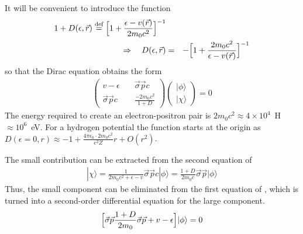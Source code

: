\documentclass[11pt,a4paper]{report}
\begin{document}
It will be convenient to introduce the function
\begin{eqnarray}
1+D(\epsilon,\vec{r})
\stackrel{\text{def}}{=}\Bigl[1+\frac{\epsilon-v(\vec{r})}{2m_0c^2}\Bigr]^{-1}
\nonumber\\
\Rightarrow\quad
D(\epsilon,\vec{r})&=&-\Bigl[1+\frac{2m_0c^2}{\epsilon-v(\vec{r})}\Bigr]^{-1}
\label{eq:defrelativisticfactor}
\end{eqnarray}
so that the Dirac equation obtains the form
\begin{eqnarray}
\left(\begin{array}{cc}
v-\epsilon &\quad \vec{\sigma}\vec{p}c\\
\vec{\sigma}\vec{p}c &\quad \frac{-2m_0c^2}{1+D}\end{array}\right)
\left(\begin{array}{c}|\phi\rangle\\|\chi\rangle\end{array}\right)=0
\label{eq:dirac2by2withepsilonb}
\end{eqnarray}
The energy required to create an electron-positron pair is
$2m_0c^2\approx4\times10^4$~H$\approx 10^6$~eV.  For a hydrogen
potential the function starts at the origin as $D(\epsilon=0,r)\approx
-1+\frac{4\pi\epsilon_0\cdot2m_0c^2}{e^2Z}r+O(r^2)$.


The small contribution can be extracted from the second equation of
\begin{eqnarray}
|\chi\rangle
=\frac{1}{2m_0c^2+\epsilon-v}
\vec{\sigma}\vec{p}c |\phi\rangle
=\frac{1+D}{2m_0c}
\vec{\sigma}\vec{p} |\phi\rangle
\label{eq:defsmallcomponent}
\end{eqnarray}
Thus, the small component can be eliminated from the first equation of
, which is turned into a second-order
differential equation for the large component.
\begin{eqnarray}
\Bigl[\vec{\sigma}\vec{p} \frac{1+D}{2m_0}
\vec{\sigma}\vec{p} +v-\epsilon\Bigr]|\phi\rangle=0
\label{eq:diraclargebeforemagic}
\end{eqnarray}
\end{document}
